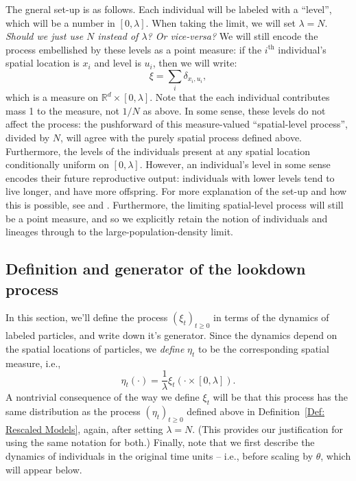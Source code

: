 \documentclass[12pt]{article}
\newcommand{\IR}{\mathbb R}
\newcommand{\lp}{\xi}              %
\newcommand{\comment}[1]{{\color{blue} \it #1}}
\begin{document}
The gneral set-up is as follows.
Each individual will be labeled with a ``level'',
which will be a number in $[0, \lambda]$.
When taking the limit, we will set $\lambda = N$.
\comment{Should we just use $N$ instead of $\lambda$? Or vice-versa?}
We will still encode the process embellished by these levels
as a point measure:
if the $i^\mathrm{th}$ individual's spatial location is $x_i$
and level is $u_i$, then we will write:
$$
    \lp = \sum_i \delta_{x_i, u_i} ,
$$
which is a measure on $\IR^d \times [0, \lambda]$.
Note that the each individual contributes mass 1 to the measure,
not $1/N$ as above.
In some sense, these levels do not affect the process:
the pushforward of this measure-valued ``spatial-level process'',
divided by $N$,
will agree with the purely spatial process defined above.
Furthermore, the levels of the individuals present at any spatial location
conditionally uniform on $[0, \lambda]$.
However, an individual's level in some sense encodes their future reproductive output:
individuals with lower levels tend to live longer, and have more offspring.
For more explanation of the set-up and how this is possible,
see \citet{etheridge/kurtz:2018} and \citet{kurtz/rodrigues:2011}.
Furthermore, the limiting spatial-level process will still be a point measure,
and so we explicitly retain the notion of individuals and lineages through to the 
large-population-density limit.


\subsection{Definition and generator of the lookdown process}
\label{sec:lookdown_defn}

In this section,
we'll define the process $(\lp_t)_{t \ge 0}$ in terms of the dynamics of labeled particles,
and write down it's generator.
Since the dynamics depend on the spatial locations of particles,
we \emph{define} $\eta_t$ to be the corresponding spatial measure,
i.e.,
$$
    \eta_t(\cdot) = \frac{1}{\lambda} \lp_t(\cdot \times [0, \lambda])  .
$$
A nontrivial consequence of the way we define $\lp_t$ will be that
this process has the same distribution as the process $(\eta_t)_{t \ge 0}$ defined above
in Definition~\ref{Def: Rescaled Models},
again, after setting $\lambda = N$.
(This provides our justification for using the same notation for both.)
Finally, note that we first describe the dynamics of individuals
in the original time units -- i.e., before scaling by $\theta$,
which will appear below.
\end{document}

